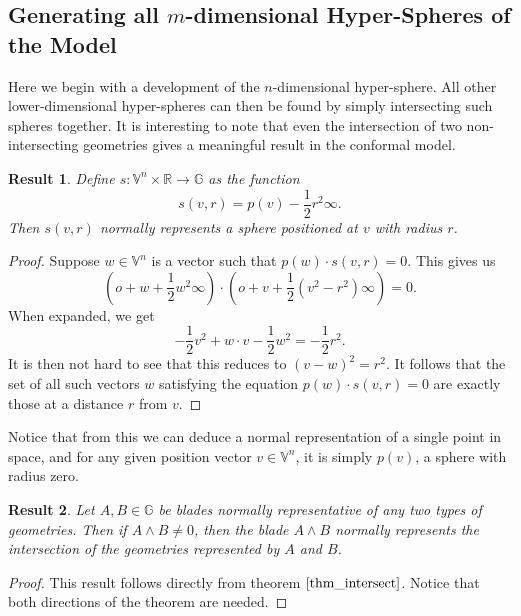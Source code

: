 \documentclass{article}
\newcommand{\R}{\mathbb{R}}
\newcommand{\V}{\mathbb{V}}
\newcommand{\G}{\mathbb{G}}
\newcommand{\nvao}{o}
\newcommand{\nvai}{\infty}
\newtheorem{result}{Result}[section]
\begin{document}
\subsection{Generating all $m$-dimensional Hyper-Spheres of the Model}\label{sec_gen_all_spheres}

Here we begin with a development of the $n$-dimensional hyper-sphere.
All other lower-dimensional hyper-spheres can then be found by simply
intersecting such spheres together.  It is interesting to note that
even the intersection of two non-intersecting geometries gives a meaningful
result in the conformal model.

\begin{result}\label{rslt_sphere_def}
Define $s:\V^n\times\R\to\G$ as the function
\begin{equation*}
s(v,r)=p(v) - \frac{1}{2}r^2\nvai.
\end{equation*}
Then $s(v,r)$ normally represents a sphere positioned at $v$ with radius $r$.
\end{result}
\begin{proof}
Suppose $w\in\V^n$ is a vector such that $p(w)\cdot s(v,r)=0$.
This gives us
\begin{equation*}
\left(\nvao+w+\frac{1}{2}w^2\nvai\right)\cdot\left(\nvao+v+\frac{1}{2}(v^2-r^2)\nvai\right)=0.
\end{equation*}
When expanded, we get
\begin{equation*}
-\frac{1}{2}v^2+w\cdot v-\frac{1}{2}w^2=-\frac{1}{2}r^2.
\end{equation*}
It is then not hard to see that this reduces to $(v-w)^2=r^2$.
It follows that the set of all such vectors $w$ satisfying the
equation $p(w)\cdot s(v,r)=0$ are exactly those at a distance $r$ from $v$.
\end{proof}

Notice that from this we can deduce a normal representation of a single
point in space, and for any given position vector $v\in\V^n$, it is simply
$p(v)$, a sphere with radius zero.

\begin{result}\label{rslt_intersection}
Let $A,B\in\G$ be blades normally representative of any two types of geometries.
Then if $A\wedge B\neq 0$, then the blade $A\wedge B$ normally represents the
intersection of the geometries represented by $A$ and $B$.
\end{result}
\begin{proof}
This result follows directly from theorem $\eqref{thm_intersect}$.
Notice that both directions of the theorem are needed.
\end{proof}
\end{document}
